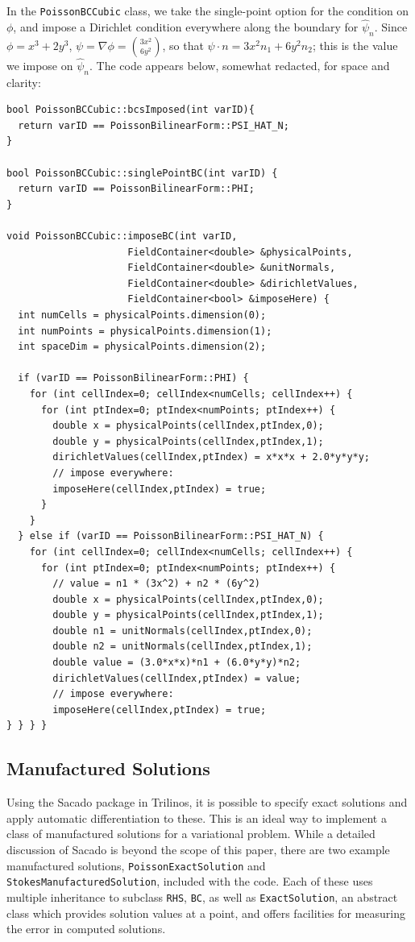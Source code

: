 In the \verb=PoissonBCCubic= class, we take the single-point option for the condition on $\phi$, and impose a Dirichlet condition everywhere along the boundary for $\widehat{\psi}_{n}$.  Since $\phi=x^{3}+2y^{3}$, $\psi=\nabla \phi = {3 x^{2} \choose 6 y^{2}}$, so that $\psi \cdot n = 3x^{2}n_{1} + 6 y^{2} n_{2}$; this is the value we impose on $\widehat{\psi}_{n}$.  The code appears below, somewhat redacted, for space and clarity:
\begin{lstlisting}
bool PoissonBCCubic::bcsImposed(int varID){
  return varID == PoissonBilinearForm::PSI_HAT_N;
}

bool PoissonBCCubic::singlePointBC(int varID) {
  return varID == PoissonBilinearForm::PHI;
}

void PoissonBCCubic::imposeBC(int varID, 
                     FieldContainer<double> &physicalPoints,
                     FieldContainer<double> &unitNormals,
                     FieldContainer<double> &dirichletValues,
                     FieldContainer<bool> &imposeHere) {
  int numCells = physicalPoints.dimension(0);
  int numPoints = physicalPoints.dimension(1);
  int spaceDim = physicalPoints.dimension(2);
  
  if (varID == PoissonBilinearForm::PHI) {
    for (int cellIndex=0; cellIndex<numCells; cellIndex++) {
      for (int ptIndex=0; ptIndex<numPoints; ptIndex++) {
        double x = physicalPoints(cellIndex,ptIndex,0);
        double y = physicalPoints(cellIndex,ptIndex,1);
        dirichletValues(cellIndex,ptIndex) = x*x*x + 2.0*y*y*y;
        // impose everywhere:
        imposeHere(cellIndex,ptIndex) = true;
      }
    }
  } else if (varID == PoissonBilinearForm::PSI_HAT_N) {
    for (int cellIndex=0; cellIndex<numCells; cellIndex++) {
      for (int ptIndex=0; ptIndex<numPoints; ptIndex++) {
        // value = n1 * (3x^2) + n2 * (6y^2)
        double x = physicalPoints(cellIndex,ptIndex,0);
        double y = physicalPoints(cellIndex,ptIndex,1);
        double n1 = unitNormals(cellIndex,ptIndex,0);
        double n2 = unitNormals(cellIndex,ptIndex,1);
        double value = (3.0*x*x)*n1 + (6.0*y*y)*n2;
        dirichletValues(cellIndex,ptIndex) = value;
        // impose everywhere:
        imposeHere(cellIndex,ptIndex) = true; 
} } } }
\end{lstlisting}

\subsection{Manufactured Solutions}
Using the Sacado package in Trilinos, it is possible to specify exact solutions and apply automatic differentiation to these.  This is an ideal way to implement a class of manufactured solutions for a variational problem.  While a detailed discussion of Sacado is beyond the scope of this paper, there are two example manufactured solutions, \verb=PoissonExactSolution= and \verb=StokesManufacturedSolution=, included with the code.  Each of these uses multiple inheritance to subclass \verb=RHS=, \verb=BC=, as well as \verb=ExactSolution=, an abstract class which provides solution values at a point, and offers facilities for measuring the error in computed solutions.

